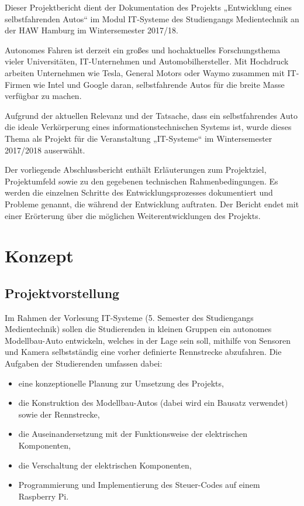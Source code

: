 \documentclass[a4paper, 12pt]{scrartcl}
\begin{document}
Dieser Projektbericht dient der Dokumentation des Projekts „Entwicklung eines selbstfahrenden Autos“ im Modul IT-Systeme des Studiengangs Medientechnik an der HAW Hamburg im Wintersemester 2017/18.

Autonomes Fahren ist derzeit ein großes und hochaktuelles Forschungsthema vieler Universitäten, IT-Unternehmen und Automobilhersteller. Mit Hochdruck arbeiten Unternehmen wie Tesla, General Motors oder Waymo zusammen mit IT-Firmen wie Intel und Google daran, selbstfahrende Autos für die breite Masse verfügbar zu machen.

Aufgrund der aktuellen Relevanz und der Tatsache, dass ein selbstfahrendes Auto die ideale Verkörperung eines informationstechnischen Systems ist, wurde dieses Thema als Projekt für die Veranstaltung „IT-Systeme“ im Wintersemester 2017/2018 auserwählt.

Der vorliegende Abschlussbericht enthält Erläuterungen zum Projektziel, Projektumfeld sowie zu den gegebenen technischen Rahmenbedingungen. Es werden die einzelnen Schritte des Entwicklungsprozesses dokumentiert und Probleme genannt, die während der Entwicklung auftraten. Der Bericht endet mit einer Erörterung über die möglichen Weiterentwicklungen des Projekts.

\section{Konzept}

\subsection{Projektvorstellung}

Im Rahmen der Vorlesung IT-Systeme (5. Semester des Studiengangs Medientechnik) sollen die Studierenden in kleinen Gruppen ein autonomes Modellbau-Auto entwickeln, welches in der Lage sein soll, mithilfe von Sensoren und Kamera selbstständig eine vorher definierte Rennstrecke abzufahren. Die Aufgaben der Studierenden umfassen dabei:

\begin{itemize}
	\item eine konzeptionelle Planung zur Umsetzung des Projekts,
	\item die Konstruktion des Modellbau-Autos (dabei wird ein Bausatz verwendet) sowie der Rennstrecke,
	\item die Auseinandersetzung mit der Funktionsweise der elektrischen Komponenten,
	\item die Verschaltung der elektrischen Komponenten,
	\item Programmierung und Implementierung des Steuer-Codes auf einem Raspberry Pi.
\end{itemize}
\end{document}
